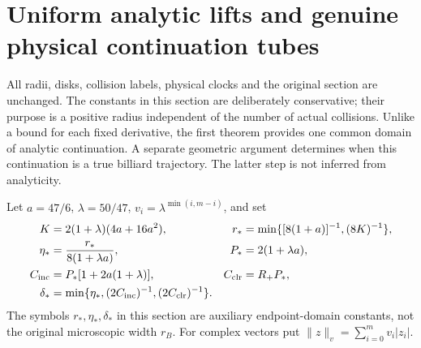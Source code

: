 \section{Uniform analytic lifts and genuine physical continuation tubes}
\label{sec:pt-tubes}
All radii, disks, collision labels, physical clocks and the original
section are unchanged.  The constants in this section are deliberately
conservative; their purpose is a positive radius independent of the
number of actual collisions.  Unlike a bound for each fixed derivative,
the first theorem provides one common domain of analytic continuation.
A separate geometric argument determines when this continuation is a
true billiard trajectory.  The latter step is not inferred from analyticity.

Let $a=47/6$, $\lambda=50/47$, $v_i=\lambda^{\min(i,m-i)}$, and set
\begin{align}
 K&=2(1+\lambda)(4a+16a^2),
 &r_*&=\min\{[8(1+a)]^{-1},(8K)^{-1}\},\notag\\
 \eta_*&=\frac{r_*}{8(1+\lambda a)},
 &P_*&=2(1+\lambda a),\label{eq:pt-analytic-constants}\\
 C_{\rm inc}&=P_*[1+2a(1+\lambda)],
 &C_{\rm clr}&=R_+P_*,\notag\\
 \delta_*&=\min\{\eta_*,(2C_{\rm inc})^{-1},
                              (2C_{\rm clr})^{-1}\}.\label{eq:pt-tube-constant}
\end{align}
The symbols $r_*,\eta_*,\delta_*$ in this section are auxiliary
endpoint-domain constants, not the original microscopic width $r_B$.
For complex vectors put $\|z\|_v=\sum_{i=0}^m v_i|z_i|$.

